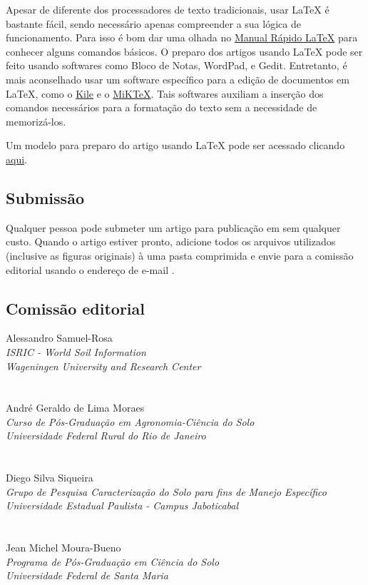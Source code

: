 Apesar de diferente dos processadores de texto tradicionais, usar \LaTeX{} é bastante fácil, sendo necessário apenas compreender a sua lógica de funcionamento. Para isso é bom dar uma olhada no \href{http://www.stdout.org/~winston/latex/}{Manual Rápido \LaTeX{}} para conhecer alguns comandos básicos. O preparo dos artigos usando \LaTeX{} pode ser feito usando softwares como Bloco de Notas, WordPad, e Gedit. Entretanto, é mais aconselhado usar um software específico para a edição de documentos em \LaTeX, como o \href{http://kile.sourceforge.net/}{Kile} e o \href{http://miktex.org/}{MiKTeX}. Tais softwares auxiliam a inserção dos comandos necessários para a formatação do texto sem a necessidade de memorizá-los.

Um modelo para preparo do artigo usando \LaTeX{} pode ser acessado clicando \href{https://docs.google.com/document/d/1F3IXzWNCeUrwKeFxA4iHS3aw1nforK1IqB126xbawvA/edit?usp=sharing}{aqui}.

\subsection{Submissão}

Qualquer pessoa pode submeter um artigo para publicação em \pedometria{} sem qualquer custo. Quando o artigo estiver pronto, adicione todos os arquivos utilizados (inclusive as figuras originais) à uma pasta comprimida e envie para a comissão editorial usando o endereço de e-mail .

\subsection{Comissão editorial}

Alessandro Samuel-Rosa\\
\textit{ISRIC - World Soil Information}\\
\textit{Wageningen University and Research Center}\\
\\
\\
André Geraldo de Lima Moraes\\
\textit{Curso de Pós-Graduação em Agronomia-Ciência do Solo}\\
\textit{Universidade Federal Rural do Rio de Janeiro}\\
\\
\\
Diego Silva Siqueira\\
\textit{Grupo de Pesquisa Caracterização do Solo para fins de Manejo Específico}\\
\textit{Universidade Estadual Paulista - Campus Jaboticabal}\\
\\
\\
Jean Michel Moura-Bueno\\
\textit{Programa de Pós-Graduação em Ciência do Solo}\\
\textit{Universidade Federal de Santa Maria}\\

